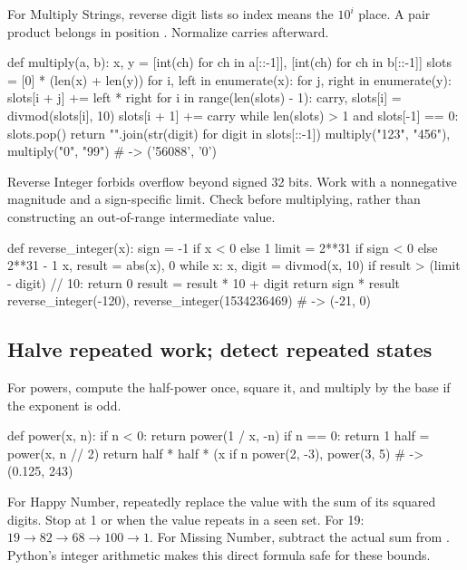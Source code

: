 \documentclass[11pt]{article}
\newcommand{\cd}[1]{{\frenchspacing\texttt{\detokenize{#1}}}}
\begin{document}
For Multiply Strings, reverse digit lists so index \cd{i} means the \(10^i\) place.
A pair product belongs in position \cd{i+j}. Normalize carries afterward.
\par\noindent\begin{minipage}{\linewidth}
\hypertarget{example-start-67}{}
\begin{pyex}
def multiply(a, b):
    x, y = [int(ch) for ch in a[::-1]], [int(ch) for ch in b[::-1]]
    slots = [0] * (len(x) + len(y))
    for i, left in enumerate(x):
        for j, right in enumerate(y):
            slots[i + j] += left * right
    for i in range(len(slots) - 1):
        carry, slots[i] = divmod(slots[i], 10)
        slots[i + 1] += carry
    while len(slots) > 1 and slots[-1] == 0:
        slots.pop()
    return "".join(str(digit) for digit in slots[::-1])
multiply("123", "456"), multiply("0", "99") # -> ('56088', '0')
\end{pyex}
\hypertarget{example-end-67}{}
\end{minipage}\par
Reverse Integer forbids overflow beyond signed 32 bits. Work with a nonnegative magnitude and a sign-specific limit.
Check before multiplying, rather than constructing an out-of-range intermediate value.
\par\noindent\begin{minipage}{\linewidth}
\hypertarget{example-start-68}{}
\begin{pyex}
def reverse_integer(x):
    sign = -1 if x < 0 else 1
    limit = 2**31 if sign < 0 else 2**31 - 1
    x, result = abs(x), 0
    while x:
        x, digit = divmod(x, 10)
        if result > (limit - digit) // 10:
            return 0
        result = result * 10 + digit
    return sign * result
reverse_integer(-120), reverse_integer(1534236469) # -> (-21, 0)
\end{pyex}
\hypertarget{example-end-68}{}
\end{minipage}\par

\subsection{Halve repeated work; detect repeated states}
For powers, compute the half-power once, square it, and multiply by the base if the exponent is odd.
\par\noindent\begin{minipage}{\linewidth}
\hypertarget{example-start-69}{}
\begin{pyex}
def power(x, n):
    if n < 0:
        return power(1 / x, -n)
    if n == 0:
        return 1
    half = power(x, n // 2)
    return half * half * (x if n %
power(2, -3), power(3, 5)            # -> (0.125, 243)
\end{pyex}
\hypertarget{example-end-69}{}
\end{minipage}\par
For Happy Number, repeatedly replace the value with the sum of its squared digits.
Stop at 1 or when the value repeats in a seen set. For 19: \(19\to82\to68\to100\to1\).
For Missing Number, subtract the actual sum from \cd{n * (n + 1) // 2}.
Python's integer arithmetic makes this direct formula safe for these bounds.
\end{document}
